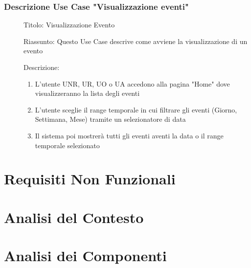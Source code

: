 \documentclass{article}
\let\origthesubsection\thesubsection
\begin{document}
\subsubsection*{Descrizione Use Case "Visualizzazione eventi"}
\begin{description}
    \item[] Titolo: Visualizzazione Evento
    \item[] Riassunto: Questo Use Case descrive come avviene la visualizzazione di un evento
    \item[] Descrizione:
        \begin{enumerate}
            \item L'utente UNR, UR, UO o UA accedono alla pagina "Home" dove visualizzeranno la lista degli eventi
            \item L'utente sceglie il range temporale in cui filtrare gli eventi (Giorno, Settimana, Mese) tramite un selezionatore di data
            \item Il sistema poi mostrerà tutti gli eventi aventi la data o il range temporale selezionato
        \end{enumerate}
\end{description}
\renewcommand\thesubsection{\origthesubsection}
\clearpage
\section{Requisiti Non Funzionali}
\begin{description}
    \item[]
\end{description}
\clearpage
\section{Analisi del Contesto}
\begin{description}
    \item[]
\end{description}
\clearpage
\section{Analisi dei Componenti}
\begin{description}
    \item[]
\end{description}
\end{document}
